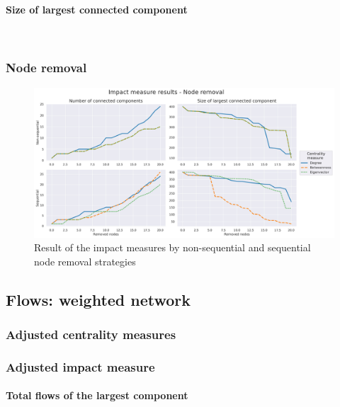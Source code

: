 \documentclass{article}
\begin{document}
\paragraph{Size of largest connected component}\mbox{}\\

\subsubsection{Node removal}


\begin{figure}[htp]
    \centering
    \includegraphics[width=15cm]{Results_Impact_Measures_Total.jpg}
    \caption{Result of the impact measures by non-sequential and sequential node removal strategies}
    \label{fig:impact_results}
\end{figure}

\subsection{Flows: weighted network}

\subsubsection{Adjusted centrality measures}

\subsubsection{Adjusted impact measure}

\paragraph{Total flows of the largest component}\mbox{}\\
\end{document}
